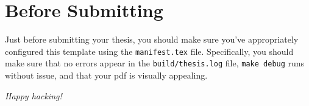 \chapter{Before Submitting}
\label{chap:before-submitting}

Just before submitting your thesis, you should make sure you've appropriately
configured this template using the \texttt{manifest.tex} file. Specifically, you
should make sure that no errors appear in the \texttt{build/thesis.log} file,
\texttt{make debug} runs without issue, and that your \acs{pdf} is visually
appealing.

\vspace*{1cm}

\emph{Happy hacking!}
